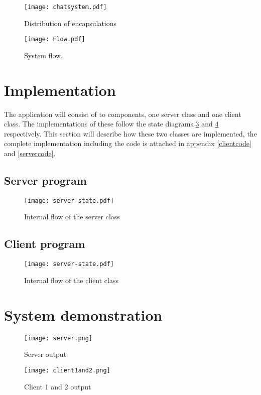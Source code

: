 \begin{figure}
\centering
\texttt{[image: chatsystem.pdf]}
\caption{Distribution of encapsulations}
\label{fig:encapdistr}
\end{figure}

\begin{figure}
\centering
\texttt{[image: Flow.pdf]}
\caption{System flow.}
\label{fig:flow}
\end{figure}




\section{Implementation}
The application will consist of to components, one server class and one client class. The implementations of these follow the state diagrams \ref{fig:server-state} and \ref{fig:client-state} respectively. This section will describe how these two classes are implemented, the complete implementation including the code is attached in appendix \ref{clientcode} and \ref{servercode}. 
\subsection{Server program} 

\begin{figure}
\centering
\texttt{[image: server-state.pdf]}
\caption{Internal flow of the server class}
\label{fig:server-state}
\end{figure}


\subsection{Client program}


\begin{figure}
\centering
\texttt{[image: server-state.pdf]}
\caption{Internal flow of the client class}
\label{fig:client-state}
\end{figure}

\section{System demonstration}
\begin{figure}
\centering
\texttt{[image: server.png]}
\caption{Server output}
\label{fig:server-output}
\end{figure}

\begin{figure}
\centering
\texttt{[image: client1and2.png]}
\caption{Client 1 and 2 output}
\label{fig:client12-output}
\end{figure}
